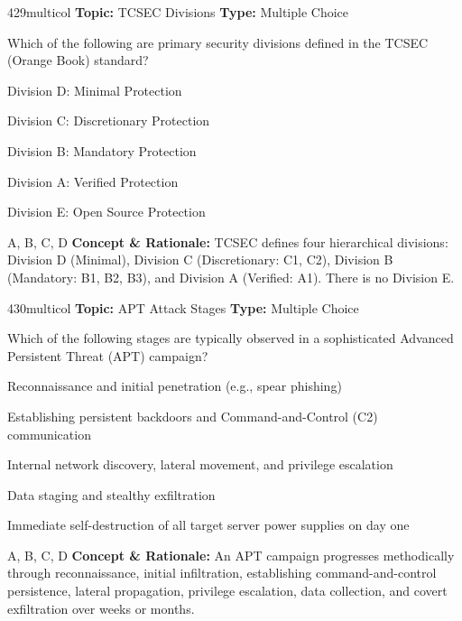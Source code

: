 \begin{qcard}{429}{multicol}
\textcolor{darkslate!75}{\small\textbf{Topic:} TCSEC Divisions \hfill \textbf{Type:} Multiple Choice}\vspace{0.4em}\par
Which of the following are primary security divisions defined in the TCSEC (Orange Book) standard?
\begin{qoptions}
\item Division D: Minimal Protection
\item Division C: Discretionary Protection
\item Division B: Mandatory Protection
\item Division A: Verified Protection
\item Division E: Open Source Protection
\end{qoptions}
\end{qcard}
\nopagebreak
\begin{explainbox}{A, B, C, D}
\textbf{Concept \& Rationale:} TCSEC defines four hierarchical divisions: Division D (Minimal), Division C (Discretionary: C1, C2), Division B (Mandatory: B1, B2, B3), and Division A (Verified: A1). There is no Division E.
\end{explainbox}

\begin{qcard}{430}{multicol}
\textcolor{darkslate!75}{\small\textbf{Topic:} APT Attack Stages \hfill \textbf{Type:} Multiple Choice}\vspace{0.4em}\par
Which of the following stages are typically observed in a sophisticated Advanced Persistent Threat (APT) campaign?
\begin{qoptions}
\item Reconnaissance and initial penetration (e.g., spear phishing)
\item Establishing persistent backdoors and Command-and-Control (C2) communication
\item Internal network discovery, lateral movement, and privilege escalation
\item Data staging and stealthy exfiltration
\item Immediate self-destruction of all target server power supplies on day one
\end{qoptions}
\end{qcard}
\nopagebreak
\begin{explainbox}{A, B, C, D}
\textbf{Concept \& Rationale:} An APT campaign progresses methodically through reconnaissance, initial infiltration, establishing command-and-control persistence, lateral propagation, privilege escalation, data collection, and covert exfiltration over weeks or months.
\end{explainbox}

